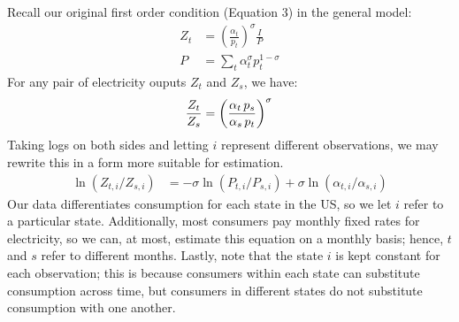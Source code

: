 \documentclass[11pt,a4paper]{extarticle}
\begin{document}
Recall our original first order condition (Equation 3) in the general model:
\begin{align*}
Z_t &= \left(\frac{\alpha_t}{p_t} \right)^\sigma \frac{I}{P} \\
P &= \sum_t \alpha_t^\sigma p_t^{1-\sigma}
\end{align*}
For any pair of electricity ouputs $Z_t$ and $Z_s$, we have:
$$\frac{Z_t}{Z_s} = \left(\frac{\alpha_t \, p_s}{\alpha_s \, p_t} \right)^\sigma \\$$
Taking logs on both sides and letting $i$ represent different observations, we may rewrite this in a form more suitable for estimation. 
\begin{align*}
\ln (Z_{t, i} / Z_{ s, i}) &= -\sigma \ln (P_{t,i} / P_{s,i}) + \sigma \ln (\alpha_{t,i} / \alpha_{s,i}) 
\end{align*}
Our data differentiates consumption for each state in the US, so we let $i$ refer to a particular state. Additionally, most consumers pay monthly fixed rates for electricity, so we can, at most, estimate this equation on a monthly basis; hence, $t$ and $s$ refer to different months. Lastly, note that the state $i$ is kept constant for each observation; this is because consumers within each state can substitute consumption across time, but consumers in different states do not substitute consumption with one another. 
\end{document}
